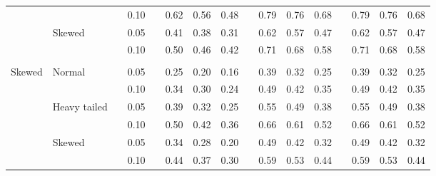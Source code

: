 \documentclass{article} %
\begin{document}
\begin{table}[ht]
\begin{scriptsize}
\begin{center}
\begin{tabular}{ll p{.1cm} c p{.1cm} rrr p{.1cm} rrr p{.1cm} rrr}
             &              && 0.10 &&   0.62 & 0.56 & 0.48 && 0.79 & 0.76 & 0.68 && 0.79 & 0.76 & 0.68 \\ 
             & Skewed       && 0.05 &&   0.41 & 0.38 & 0.31 && 0.62 & 0.57 & 0.47 && 0.62 & 0.57 & 0.47 \\ 
             &              && 0.10 &&   0.50 & 0.46 & 0.42 && 0.71 & 0.68 & 0.58 && 0.71 & 0.68 & 0.58 \\ 
             &&&&&&&&&&&&&&&\\
Skewed       & Normal       && 0.05 &&   0.25 & 0.20 & 0.16 && 0.39 & 0.32 & 0.25 && 0.39 & 0.32 & 0.25 \\ 
             &              && 0.10 &&   0.34 & 0.30 & 0.24 && 0.49 & 0.42 & 0.35 && 0.49 & 0.42 & 0.35 \\ 
             & Heavy tailed && 0.05 &&   0.39 & 0.32 & 0.25 && 0.55 & 0.49 & 0.38 && 0.55 & 0.49 & 0.38 \\ 
             &              && 0.10 &&   0.50 & 0.42 & 0.36 && 0.66 & 0.61 & 0.52 && 0.66 & 0.61 & 0.52 \\ 
             & Skewed       && 0.05 &&   0.34 & 0.28 & 0.20 && 0.49 & 0.42 & 0.32 && 0.49 & 0.42 & 0.32 \\ 
             &              && 0.10 &&   0.44 & 0.37 & 0.30 && 0.59 & 0.53 & 0.44 && 0.59 & 0.53 & 0.44 \\ 



\end{tabular}
\end{center}
\end{scriptsize}
\end{table}
\end{document}
